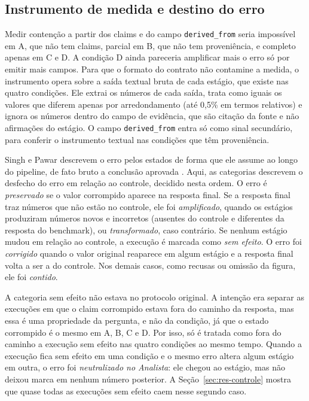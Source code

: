 \subsection{Instrumento de medida e destino do erro}\label{sec:destino}

Medir contenção a partir dos claims e do campo \texttt{derived\_from} seria impossível em A, que não tem claims, parcial em B, que não tem proveniência, e completo apenas em C e D.
A condição D ainda pareceria amplificar mais o erro só por emitir mais campos.
Para que o formato do contrato não contamine a medida, o instrumento opera sobre a saída textual bruta de cada estágio, que existe nas quatro condições.
Ele extrai os números de cada saída, trata como iguais os valores que diferem apenas por arredondamento (até 0,5\% em termos relativos) e ignora os números dentro do campo de evidência, que são citação da fonte e não afirmações do estágio.
O campo \texttt{derived\_from} entra só como sinal secundário, para conferir o instrumento textual nas condições que têm proveniência.

Singh e Pawar descrevem o erro pelos estados de forma que ele assume ao longo do pipeline, de fato bruto a conclusão aprovada \cite{singh2026snowball}.
Aqui, as categorias descrevem o desfecho do erro em relação ao controle, decidido nesta ordem.
O erro é \emph{preservado} se o valor corrompido aparece na resposta final.
Se a resposta final traz números que não estão no controle, ele foi \emph{amplificado}, quando os estágios produziram números novos e incorretos (ausentes do controle e diferentes da resposta do benchmark), ou \emph{transformado}, caso contrário.
Se nenhum estágio mudou em relação ao controle, a execução é marcada como \emph{sem efeito}.
O erro foi \emph{corrigido} quando o valor original reaparece em algum estágio e a resposta final volta a ser a do controle. Nos demais casos, como recusas ou omissão da figura, ele foi \emph{contido}.

A categoria sem efeito não estava no protocolo original.
A intenção era separar as execuções em que o claim corrompido estava fora do caminho da resposta, mas essa é uma propriedade da pergunta, e não da condição, já que o estado corrompido é o mesmo em A, B, C e D.
Por isso, só é tratada como fora do caminho a execução sem efeito nas quatro condições ao mesmo tempo.
Quando a execução fica sem efeito em uma condição e o mesmo erro altera algum estágio em outra, o erro foi \emph{neutralizado no Analista}: ele chegou ao estágio, mas não deixou marca em nenhum número posterior.
A Seção~\ref{sec:res-controle} mostra que quase todas as execuções sem efeito caem nesse segundo caso.

